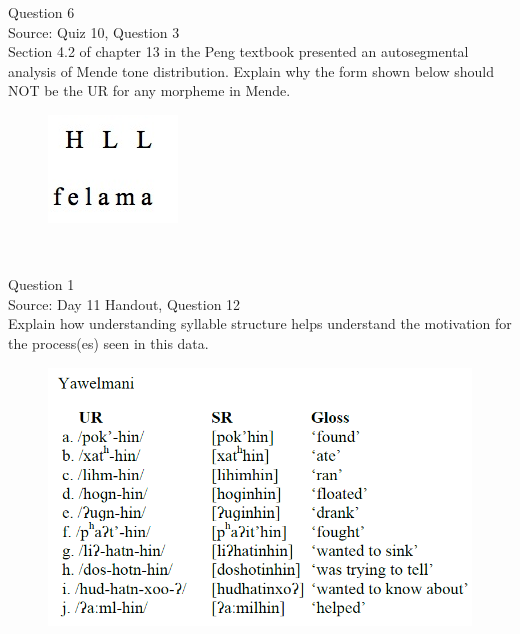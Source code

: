 \documentclass[12pt]{article}
\begin{document}
\newpage

{\large Question 6}\\

Source: Quiz 10, Question 3\\

Section 4.2 of chapter 13 in the Peng textbook presented an autosegmental analysis of Mende tone distribution. Explain why the form shown below should NOT be the UR for any morpheme in Mende.\\

\begin{figure}[H]
\includegraphics{../images/mende_junction_b.png}
\end{figure}

\newpage

\begin{center}
\textbf{{\color{red}{\HUGE END OF EXAM}}}\\

\end{center}
\newpage

\begin{center}
\textbf{{\color{blue}{\HUGE START OF EXAM\\}}}

\textbf{{\color{blue}{\HUGE Student ID: 3773\\}}}

\textbf{{\color{blue}{\HUGE 10:10 - 10:30 AM\\}}}

\end{center}
\newpage

{\large Question 1}\\

Source: Day 11 Handout, Question 12\\

Explain how understanding syllable structure helps understand the motivation for the process(es) seen in this data.\\

\begin{figure}[H]
\includegraphics{../images/yawelmani.png}
\end{figure}
\end{document}
